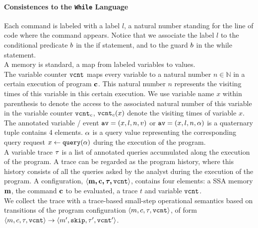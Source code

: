 \paragraph{Consistences to the {\tt While} Language}
Each command is labeled with a label $l$, a natural number standing for the line of code where the command appears. Notice that we associate the label $l$ to the conditional predicate $b$ in the if statement, and to the guard $b$ in the while statement. 
\\
A memory is standard, a map from labeled variables to values. 
%
\\
%
The variable counter $\mathtt{vcnt}$ maps every variable to a natural number $n \in \mathbb{N}$ in a certain execution of program ${\boldsymbol{\mathbf{c}}}$. This natural number $n$ represents the visiting times of this variable in this certain execution.
%
We use variable name $x$ within parenthesis to denote the access to the associated natural number of this variable in the variable counter $\mathtt{vcnt}_{c}$, 
$\mathtt{vcnt}_{c}(x)$ denote the visiting times of variable $x$.
%
\\
The annotated variable / event $\mathtt{av} = (x, l, n, v) $ or $\mathtt{av} = (x, l, n, \alpha) $  is a quaternary tuple contains 4 elements. 
$\alpha$ is a query value representing the corresponding query request $\mathrel{ x \leftarrow {\tt query}(\alpha) }$ during the execution of the program.
%
\\
A variable trace $\mathtt{\tau}$ is a list of annotated queries accumulated along the execution of the program. 
A trace can be regarded as the program history, where this history consists of all the queries asked by the analyst during the execution of the program. 
%
%
A configuration, $\langle {\boldsymbol{\mathbf{m, c, \ensuremath{\mathtt{\tau}}, \ensuremath{\mathtt{vcnt}}}}} \rangle$, contains four elements: a SSA memory ${\boldsymbol{\mathbf{m}}}$, the command ${\boldsymbol{\mathbf{c}}}$ to be evaluated, a trace $t$ and variable $\mathtt{vcnt}$. 
%
\\
We collect the trace with a trace-based small-step operational semantics based on transitions of the program configuration $\langle m, c, \mathtt{\tau}, \mathtt{vcnt} \rangle$,
of form $ \langle m,c, \mathtt{\tau}, \mathtt{vcnt} \rangle \to \langle m', \mathtt{skip}, \mathtt{\tau}', \mathtt{vcnt}' \rangle $. 
%
\\
%
